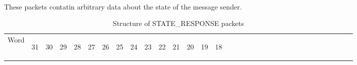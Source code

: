 \documentclass[11pt]{article}
\begin{document}
\paragraph{}
These packets contatin arbitrary data about the state of the message sender.
\newline
\begin{table}[h!]
    \centering
    \caption{Structure of STATE\_RESPONSE packets}
    \label{tab:stateResponseDef}
    \begin{tabular}{|p{1cm}|m{0.04cm}|m{0.04cm}|m{0.04cm}|m{0.04cm}|m{0.04cm}|m{0.04cm}|m{0.04cm}|m{0.04cm}|m{0.04cm}|
        m{0.04cm}|m{0.04cm}|m{0.04cm}|m{0.04cm}|m{0.04cm}|m{0.04cm}|m{0.04cm}|m{0.04cm}|m{0.04cm}|m{0.04cm}|m{0.04cm}|
        m{0.04cm}|m{0.04cm}|m{0.04cm}|m{0.04cm}|m{0.04cm}|m{0.04cm}|m{0.04cm}|m{0.04cm}|m{0.04cm}|m{0.04cm}|m{0.04cm}|m{0.04cm}|}
        \hline
        Word & 
        \begin{sideways}31\end{sideways} &
        \begin{sideways}30\end{sideways} & 
        \begin{sideways}29\end{sideways} &
        \begin{sideways}28\end{sideways} &
        \begin{sideways}27\end{sideways} &
        \begin{sideways}26\end{sideways} &
        \begin{sideways}25\end{sideways} &
        \begin{sideways}24\end{sideways} &
        \begin{sideways}23\end{sideways} &
        \begin{sideways}22\end{sideways} &
        \begin{sideways}21\end{sideways} &
        \begin{sideways}20\end{sideways} &
        \begin{sideways}19\end{sideways} &
        \begin{sideways}18\end{sideways} &

\end{tabular}
\end{table}
\end{document}
